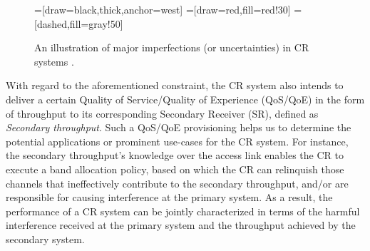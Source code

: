 \begin{figure}
\centering 
{}=[draw=black,thick,anchor=west]
=[draw=red,fill=red!30]
=[dashed,fill=gray!50]
\label{fig:imp}
\caption{An illustration of major imperfections (or uncertainties) in CR systems \cite{Sharma15}.} 
\end{figure}

With regard to the aforementioned constraint, the CR system also intends to deliver a certain Quality of Service/Quality of Experience (QoS/QoE) in the form of throughput to its corresponding Secondary Receiver (SR), defined as \textit{Secondary throughput}. Such a QoS/QoE provisioning helps us to determine the potential applications or prominent use-cases for the CR system. For instance, the secondary throughput's knowledge over the access link enables the CR to execute a band allocation policy, based on which the CR can relinquish those channels that ineffectively contribute to the secondary throughput, and/or are responsible for causing interference at the primary system. As a result, the performance of a CR system can be jointly characterized in terms of the harmful interference received at the primary system and the throughput achieved by the secondary system.

